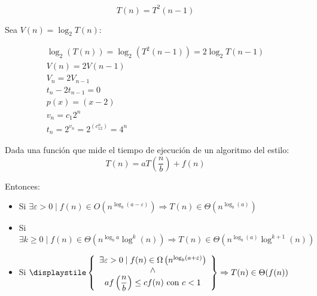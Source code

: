 \begin{ejemplo}
\begin{equation*}
    T(n) = T^2(n-1)
\end{equation*}

Sea $V(n) = \log_2 T(n)$:

\begin{gather*}
    \log_2(T(n)) = \log_2\left(T^2 (n-1)\right) = 2\log_2 T(n-1)\\
    V(n) = 2V(n-1)\\
    V_n = 2V_{n-1}\\
    t_n - 2t_{n-1} = 0\\
    p(x) = (x-2)\\
    v_n = c_1 2^n\\
    t_n = 2^{v_n} = 2^{(c_12^n)} = 4^n
\end{gather*}
\end{ejemplo}

\begin{teo}
    Dada una función que mide el tiempo de ejecución de un algoritmo del estilo:
\begin{equation*}
    T(n) = aT\left(\dfrac{n}{b}\right) + f(n)
\end{equation*}

Entonces:
\begin{itemize}
    \item Si $\exists \varepsilon > 0 \mid f(n) \in O\left(n^{\log_b(a-\varepsilon)}\right) \Rightarrow T(n)  \in \Theta\left(n^{\log_b(a)}\right)$
    \item Si $\exists k\geq 0 \mid f(n) \in \Theta\left(n^{\log_b a} \log^k(n)\right) \Rightarrow T(n)  \in \Theta\left(n^{\log_b(a)}\log^{k+1}(n)\right)$
    \item Si $\displaystile\left\{ \begin{array}{c}
               \exists \varepsilon > 0 \mid f(n) \in \Omega\left(n^{\log_b(a+\varepsilon)}\right) \\ \land\\
               af\left(\dfrac{n}{b}\right) \leq cf(n) \text{\ con\ } c<1
       \end{array}\right\} \Rightarrow T(n)  \in \Theta(f(n))$
\end{itemize}
\end{teo}

